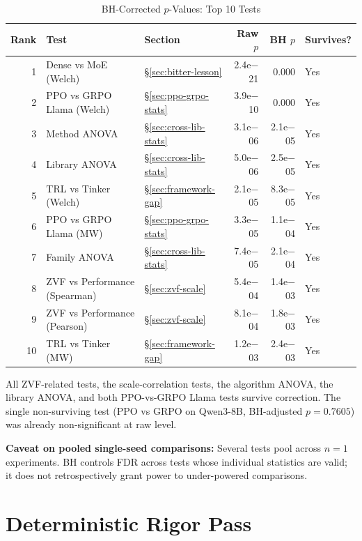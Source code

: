 \documentclass[12pt,a4paper]{report}
\theoremstyle{definition}
\begin{document}
\begin{table}[htbp]
\centering
\caption{BH-Corrected $p$-Values: Top 10 Tests}
\label{tab:bh-top10}
\footnotesize
\begin{tabular}{rllrrl}
\toprule
\textbf{Rank} & \textbf{Test} & \textbf{Section} & \textbf{Raw $p$} & \textbf{BH $p$} & \textbf{Survives?} \\
\midrule
1  & Dense vs MoE (Welch)         & \S\ref{sec:bitter-lesson} & 2.4e$-$21 & 0.000    & Yes \\
2  & PPO vs GRPO Llama (Welch)    & \S\ref{sec:ppo-grpo-stats} & 3.9e$-$10 & 0.000    & Yes \\
3  & Method ANOVA                 & \S\ref{sec:cross-lib-stats} & 3.1e$-$06 & 2.1e$-$05 & Yes \\
4  & Library ANOVA                & \S\ref{sec:cross-lib-stats} & 5.0e$-$06 & 2.5e$-$05 & Yes \\
5  & TRL vs Tinker (Welch)        & \S\ref{sec:framework-gap} & 2.1e$-$05 & 8.3e$-$05 & Yes \\
6  & PPO vs GRPO Llama (MW)       & \S\ref{sec:ppo-grpo-stats} & 3.3e$-$05 & 1.1e$-$04 & Yes \\
7  & Family ANOVA                 & \S\ref{sec:cross-lib-stats} & 7.4e$-$05 & 2.1e$-$04 & Yes \\
8  & ZVF vs Performance (Spearman) & \S\ref{sec:zvf-scale} & 5.4e$-$04 & 1.4e$-$03 & Yes \\
9  & ZVF vs Performance (Pearson)  & \S\ref{sec:zvf-scale} & 8.1e$-$04 & 1.8e$-$03 & Yes \\
10 & TRL vs Tinker (MW)            & \S\ref{sec:framework-gap} & 1.2e$-$03 & 2.4e$-$03 & Yes \\
\bottomrule
\end{tabular}
\end{table}

All ZVF-related tests, the scale-correlation tests, the algorithm ANOVA, the library ANOVA, and both
PPO-vs-GRPO Llama tests survive correction. The single non-surviving test (PPO vs GRPO on Qwen3-8B,
BH-adjusted $p = 0.7605$) was already non-significant at raw level.

\textbf{Caveat on pooled single-seed comparisons:} Several tests pool across $n = 1$ experiments. BH
controls FDR across tests whose individual statistics are valid; it does not retrospectively grant
power to under-powered comparisons.

\section{Deterministic Rigor Pass}
\label{sec:rigor-pass}
\end{document}
